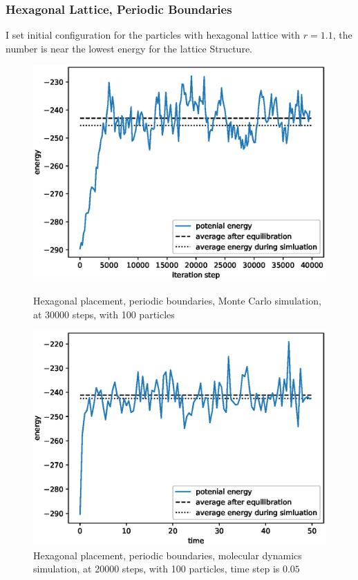 \documentclass[UTF8,a4paper,no-math]{article}
\begin{document}
\subsubsection{Hexagonal Lattice, Periodic Boundaries}
I set initial configuration for the particles with hexagonal lattice with $r = 1.1$, the number is near the lowest energy for the lattice Structure.
\begin{figure}[H]
	\centering
	\begin{minipage}[t]{0.45\textwidth}
		\centering
		\includegraphics[height=0.2\textheight]{fig/plot_40000_steps_100_particles_0.8442_rho_0.728_tempure_1.eps}
		\caption{Hexagonal placement, periodic boundaries, Monte Carlo simulation, at 30000 steps, with 100 particles}
	\end{minipage}\hspace{0.5cm}
	\begin{minipage}[t]{0.45\textwidth}
		\centering
		\includegraphics[height=0.2\textheight]{fig/md_plot_norand__10000_steps_100_particles_0.8442_rho_0.728_tempure_.eps}
		\caption{Hexagonal placement, periodic boundaries, molecular dynamics simulation, at 20000 steps, with 100 particles, time step is $0.05$}
	\end{minipage}
\end{figure}
\end{document}
